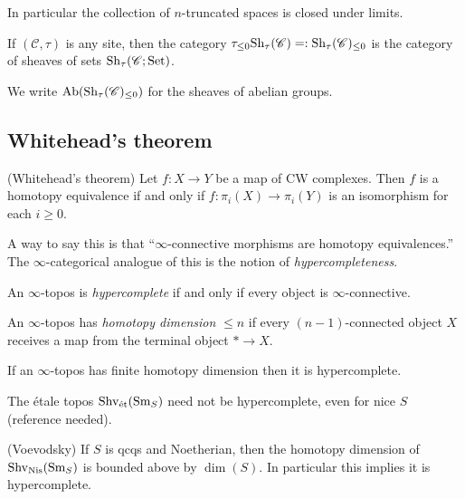 \documentclass[11pt]{amsart}
\begin{document}
In particular the collection of $n$-truncated spaces is closed under limits.


\begin{definition} If $(\mathscr{C},\tau)$ is any site, then the category $\tau_{\le 0}\mathrm{Sh}_\tau(\mathscr{C}) =: \mathrm{Sh}_\tau(\mathscr{C}) _{\le 0}$ is the category of sheaves of sets $\mathrm{Sh}_\tau(\mathscr{C};\mathrm{Set})$.
\end{definition}

\begin{notation} We write $\mathrm{Ab}(\mathrm{Sh}_\tau(\mathscr{C})_{\le 0})$ for the sheaves of abelian groups.
\end{notation}



\subsection{Whitehead's theorem}

\begin{theorem} (Whitehead's theorem) Let $f \colon X \to Y$ be a map of CW complexes. Then $f$ is a homotopy equivalence if and only if $f \colon \pi_i(X) \to \pi_i(Y)$ is an isomorphism for each $i\ge0$.
\end{theorem}

A way to say this is that ``$\infty$-connective morphisms are homotopy equivalences.'' The $\infty$-categorical analogue of this is the notion of \textit{hypercompleteness}.

\begin{definition} An $\infty$-topos is \textit{hypercomplete} if and only if every object is $\infty$-connective.
\end{definition}

\begin{definition} \cite[7.2.11]{HTT} An $\infty$-topos has \textit{homotopy dimension} $\le n$ if every $(n-1)$-connected object $X$ receives a map from the terminal object $\ast \to X$.
\end{definition}

\begin{theorem} If an $\infty$-topos has finite homotopy dimension then it is hypercomplete.
\end{theorem}

\begin{warning} The \'etale topos $\mathrm{Shv}_{\text{\'{e}t}}(\mathrm{Sm}_S)$ need not be hypercomplete, even for nice $S$ (reference needed).
\end{warning}

\begin{theorem} (Voevodsky) If $S$ is qcqs and Noetherian, then the homotopy dimension of $\mathrm{Shv}_{\mathrm{Nis}}(\mathrm{Sm}_S)$ is bounded above by $\dim(S)$. In particular this implies it is hypercomplete.
\end{theorem}
\end{document}

